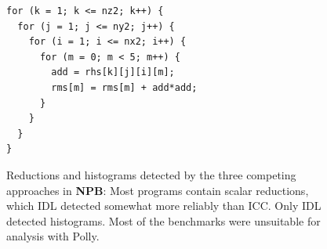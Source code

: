 \begin{figure}[H]
\begin{lstlisting}[language=MyCpp, label={missedscalar}, caption=
   {Some reductions were missed by all detection approaches:
    In this loop from ``SP'', the outer loops are reduction loops,
    accumulating into the scalar variables
    \texttt{rms[0]},\dots,\texttt{rms[4]},
    but the innermost loop is not a reduction, and therefore it
    is not captured by the IDL specification.}]
for (k = 1; k <= nz2; k++) {
  for (j = 1; j <= ny2; j++) {
    for (i = 1; i <= nx2; i++) {
      for (m = 0; m < 5; m++) {
        add = rhs[k][j][i][m];
        rms[m] = rms[m] + add*add;
      } 
    } 
  } 
}
\end{lstlisting}
\end{figure}

\begin{figure}[p]
  \centering
    \caption{Reductions and histograms detected by the three competing
             approaches in {\bf NPB}:
             Most programs contain scalar reductions, which IDL detected
             somewhat more reliably than ICC.
             Only IDL detected histograms.
             Most of the benchmarks were unsuitable for analysis with Polly.}
    \label{npb_spotted}
    \vspace{2.7mm}
    \begin{tikzpicture}

\end{tikzpicture}
\end{figure}
